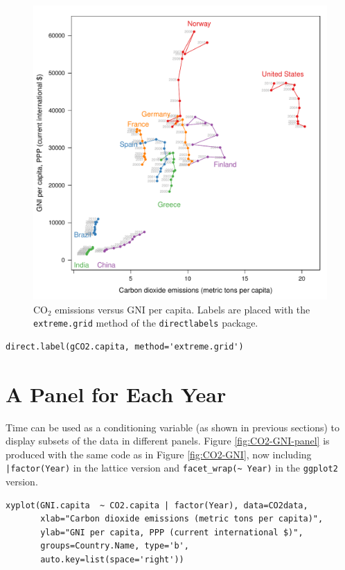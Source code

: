 \begin{figure}[htb]
\centering
\includegraphics[width=.9\linewidth]{figs/CO2_capitaDL.pdf}
\caption{\label{fig:CO2-GNI-DL}$\mathrm{CO_2}$ emissions versus GNI per capita. Labels are placed with the \texttt{extreme.grid} method of the \texttt{directlabels} package.}
\end{figure}

\lstset{language=R,numbers=none}
\begin{lstlisting}
direct.label(gCO2.capita, method='extreme.grid')
\end{lstlisting}
\section{A Panel for Each Year}
\label{sec-5}
Time can be used as a conditioning variable (as shown in previous
sections) to display subsets of the data in different panels. Figure
\ref{fig:CO2-GNI-panel} is produced with the same code as in Figure
\ref{fig:CO2-GNI}, now including \texttt{|factor(Year)} in the lattice
version and \texttt{facet\_wrap(\textasciitilde{} Year)} in the \texttt{ggplot2} version.

\lstset{language=R,numbers=none}
\begin{lstlisting}
xyplot(GNI.capita  ~ CO2.capita | factor(Year), data=CO2data,
       xlab="Carbon dioxide emissions (metric tons per capita)",
       ylab="GNI per capita, PPP (current international $)",
       groups=Country.Name, type='b',
       auto.key=list(space='right'))
\end{lstlisting}

